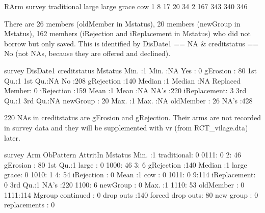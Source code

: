 \begin{Schunk}
\begin{Soutput}
      RArm
survey traditional large large grace cow
     1           8    17          20  34
     2         167   343         340 346
\end{Soutput}
\end{Schunk}

There are 26 members (\textsf{oldMember} in \textsf{Mstatus}), 
20 members (\textsf{newGroup} in \textsf{Mstatus}),
162 members (\textsf{iRejection} and \textsf{iReplacement} in \textsf{Mstatus})
who did not borrow but only saved. This is identified by \textsf{DisDate1} == NA \& \textsf{creditstatus} == No (not NAs, because they are offered and declined). 
\begin{Schunk}
\begin{Soutput}
     survey     DisDate1            creditstatus         Mstatus   
 Min.   :1   Min.   :NA    Yes            :  0   gErosion    : 80  
 1st Qu.:1   1st Qu.:NA    No             :208   gRejection  :140  
 Median :1   Median :NA    Replaced Member:  0   iRejection  :159  
 Mean   :1   Mean   :NA    NA's           :220   iReplacement:  3  
 3rd Qu.:1   3rd Qu.:NA                          newGroup    : 20  
 Max.   :1   Max.   :NA                          oldMember   : 26  
             NA's   :428                                           
\end{Soutput}
\end{Schunk}
220 NAs in \textsf{creditstatus} are \textsf{gErosion} and \textsf{gRejection}. Their arms are not recorded in survey data and they will be supplemented with \textsf{vr} (from \textsf{RCT\_vilage.dta}) later.
\begin{Schunk}
\begin{Soutput}
     survey           Arm      ObPattern  AttritIn         Mstatus   
 Min.   :1   traditional:  0   0111:  0   2: 46    gErosion    : 80  
 1st Qu.:1   large      :  0   1000: 46   3:  6    gRejection  :140  
 Median :1   large grace:  0   1010:  1   4: 54    iRejection  :  0  
 Mean   :1   cow        :  0   1011:  0   9:114    iReplacement:  0  
 3rd Qu.:1   NA's       :220   1100:  6            newGroup    :  0  
 Max.   :1                     1110: 53            oldMember   :  0  
                               1111:114                              
              Mgroup   
 continued       :  0  
 drop outs       :140  
 forced drop outs: 80  
 new group       :  0  
 replacements    :  0  
                       
                       
\end{Soutput}
\end{Schunk}


